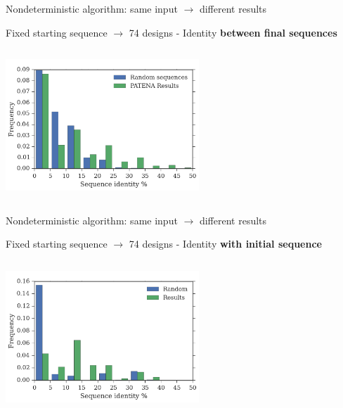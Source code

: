 \documentclass{beamer}
\begin{document}
% 
% 
\begin{frame}[plain]{Nondeterministic algorithm: same input $\rightarrow$ different results}
\centering
\vspace{10px}
\begin{adjustwidth}{-2.5em}{-2.5em}
\hspace{10px} 
Fixed starting sequence $\rightarrow$ 74 designs - Identity \textbf{between final sequences}
\end{adjustwidth}
\hspace{10px} 
\includegraphics[width=275px,height=215px]{../img/againstAll-random.png}
\end{frame}


\begin{frame}[plain]{Nondeterministic algorithm: same input $\rightarrow$ different results}
\centering
\vspace{10px}
\begin{adjustwidth}{-2.5em}{-2.5em}
\hspace{10px}
Fixed starting sequence $\rightarrow$ 74 designs - Identity \textbf{with initial sequence}
\end{adjustwidth}
\hspace{10px}
\includegraphics[width=275px,height=215px]{../img/againstInitial-random.png}
\end{frame}
\end{document}
